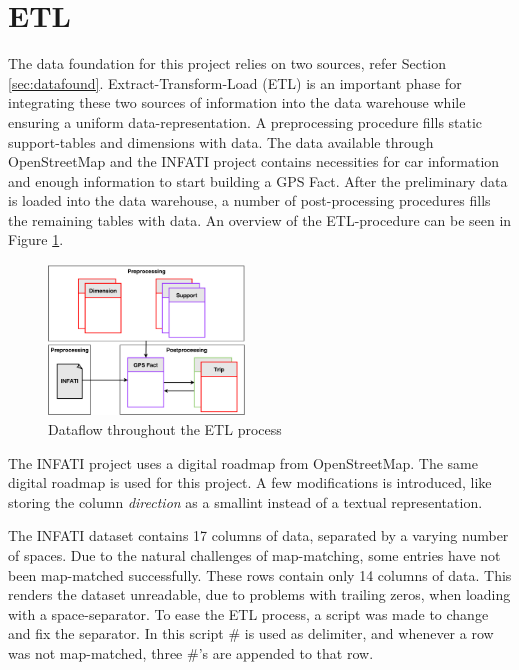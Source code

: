 \section{ETL}\label{sec:ETL}
The data foundation for this project relies on two sources, refer Section \ref{sec:datafound}. Extract-Transform-Load (ETL) is an important phase for integrating these two sources of information into the data warehouse while ensuring a uniform data-representation. A preprocessing procedure fills static support-tables and dimensions with data. The data available through OpenStreetMap\cite{osm} and the INFATI\cite{art:INFATI} project contains necessities for car information and enough information to start building a GPS Fact. After the preliminary data is loaded into the data warehouse, a number of post-processing procedures fills the remaining tables with data. An overview of the ETL-procedure can be seen in Figure \ref{fig:etl}.

\begin{figure}[tb]
\centering
\includegraphics[width=0.465\textwidth]{Pictures/ETL}
\caption{Dataflow throughout the ETL process}
\label{fig:etl}
\end{figure}

The INFATI project\cite{art:INFATI} uses a digital roadmap from OpenStreetMap\cite{osm}. The same digital roadmap is used for this project. A few modifications is introduced, like storing the column \textit{direction} as a smallint instead of a textual representation. 

The INFATI dataset\cite{art:INFATI} contains 17 columns of data, separated by a varying number of spaces. Due to the natural challenges of map-matching, some entries have not been map-matched successfully. These rows contain only 14 columns of data. This renders the dataset unreadable, due to problems with trailing zeros, when loading with a space-separator. To ease the ETL process, a script was made to change and fix the separator. In this script \# is used as delimiter, and whenever a row was not map-matched, three \#'s are appended to that row.

